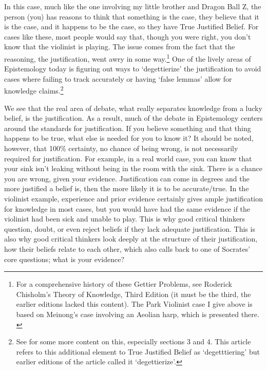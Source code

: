 In this case, much like the one involving my little brother and Dragon Ball Z, the person (you) has reasons to think that something is the case, they believe that it is the case, and it happens to be the case, so they have True Justified Belief. For cases like these, most people would say that, though you were right, you don't know that the violinist is playing. The issue comes from the fact that the reasoning, the justification, went awry in some way.\footnote{For a comprehensive history of these Gettier Problems, see Roderick Chisholm's Theory of Knowledge, Third Edition (it must be the third, the earlier editions lacked this content). The Park Violinist case I give above is based on Meinong's case involving an Aeolian harp, which is presented there. \autocite[p. 91-99]{Chisholm1}} One of the lively areas of Epistemology today is figuring out ways to `degettierize' the justification to avoid cases where failing to track accurately or having `false lemmas' allow for knowledge claims.\footnote{See  for some more content on this, especially sections 3 and 4. This article refers to this additional element to True Justified Belief as `degetttiering' but earlier editions of the article called it `degettierize'. }

We see that the real area of debate, what really separates knowledge from a lucky belief, is the justification. As a result, much of the debate in Epistemology centers around the standards for justification. If you believe something and that thing happens to be true, what else is needed for you to know it? It should be noted, however, that 100\% certainty, no chance of being wrong, is not necessarily required for justification. For example, in a real world case, you can know that your sink isn't leaking without being in the room with the sink. There is a chance you are wrong, given your evidence. Justification can come in degrees and the more justified a belief is, then the more likely it is to be accurate/true. In the violinist example, experience and prior evidence certainly gives ample justification for knowledge in most cases, but you would have had the same evidence if the violinist had been sick and unable to play. This is why good critical thinkers question, doubt, or even reject beliefs if they lack adequate justification. This is also why good critical thinkers look deeply at the structure of their justification, how their beliefs relate to each other, which also calls back to one of Socrates' core questions; what is your evidence?



